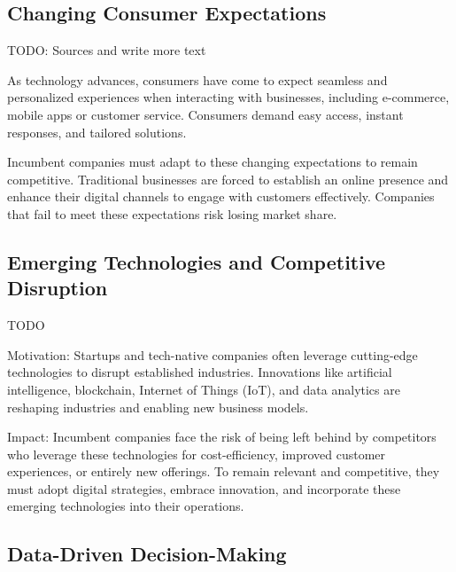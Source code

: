\documentclass[a4]{scrartcl}
\begin{document}
\subsection{Changing Consumer Expectations} \label{subsec:ChangingConsumerExpectations}



		TODO: Sources and write more text

		As technology advances, consumers have come to expect seamless and personalized experiences when interacting with businesses, including e-commerce, mobile apps or customer service. Consumers demand easy access, instant responses, and tailored solutions.
		
		Incumbent companies must adapt to these changing expectations to remain competitive. Traditional businesses are forced to establish an online presence and enhance their digital channels to engage with  customers effectively. Companies that fail to meet these expectations risk losing market share.

	
	
	
\subsection{Emerging Technologies and Competitive Disruption} \label{subsec:EmergingTechnologiesandCompetitiveDisruption}

	TODO

	Motivation: Startups and tech-native companies often leverage cutting-edge technologies to disrupt established industries. Innovations like artificial intelligence, blockchain, Internet of Things (IoT), and data analytics are reshaping industries and enabling new business models.
	
	
	
	Impact: Incumbent companies face the risk of being left behind by competitors who leverage these technologies for cost-efficiency, improved customer experiences, or entirely new offerings. To remain relevant and competitive, they must adopt digital strategies, embrace innovation, and incorporate these emerging technologies into their operations.
	
	
\subsection{Data-Driven Decision-Making} \label{subsec:DataDrivenDecisionMaking}
\end{document}
